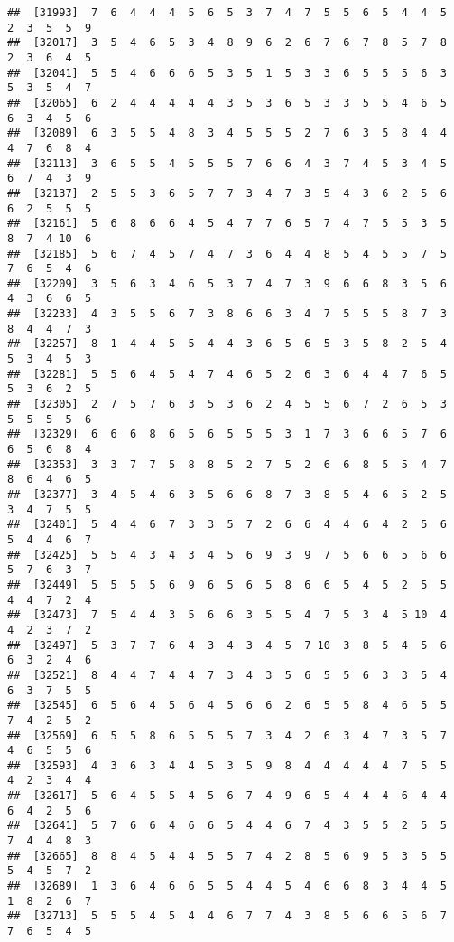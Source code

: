 \documentclass[
]{book}
\begin{document}
\begin{verbatim}
##  [31993]  7  6  4  4  4  5  6  5  3  7  4  7  5  5  6  5  4  4  5  2  3  5  5  9
##  [32017]  3  5  4  6  5  3  4  8  9  6  2  6  7  6  7  8  5  7  8  2  3  6  4  5
##  [32041]  5  5  4  6  6  6  5  3  5  1  5  3  3  6  5  5  5  6  3  5  3  5  4  7
##  [32065]  6  2  4  4  4  4  4  3  5  3  6  5  3  3  5  5  4  6  5  6  3  4  5  6
##  [32089]  6  3  5  5  4  8  3  4  5  5  5  2  7  6  3  5  8  4  4  4  7  6  8  4
##  [32113]  3  6  5  5  4  5  5  5  7  6  6  4  3  7  4  5  3  4  5  6  7  4  3  9
##  [32137]  2  5  5  3  6  5  7  7  3  4  7  3  5  4  3  6  2  5  6  6  2  5  5  5
##  [32161]  5  6  8  6  6  4  5  4  7  7  6  5  7  4  7  5  5  3  5  8  7  4 10  6
##  [32185]  5  6  7  4  5  7  4  7  3  6  4  4  8  5  4  5  5  7  5  7  6  5  4  6
##  [32209]  3  5  6  3  4  6  5  3  7  4  7  3  9  6  6  8  3  5  6  4  3  6  6  5
##  [32233]  4  3  5  5  6  7  3  8  6  6  3  4  7  5  5  5  8  7  3  8  4  4  7  3
##  [32257]  8  1  4  4  5  5  4  4  3  6  5  6  5  3  5  8  2  5  4  5  3  4  5  3
##  [32281]  5  5  6  4  5  4  7  4  6  5  2  6  3  6  4  4  7  6  5  5  3  6  2  5
##  [32305]  2  7  5  7  6  3  5  3  6  2  4  5  5  6  7  2  6  5  3  5  5  5  5  6
##  [32329]  6  6  6  8  6  5  6  5  5  5  3  1  7  3  6  6  5  7  6  6  5  6  8  4
##  [32353]  3  3  7  7  5  8  8  5  2  7  5  2  6  6  8  5  5  4  7  8  6  4  6  5
##  [32377]  3  4  5  4  6  3  5  6  6  8  7  3  8  5  4  6  5  2  5  3  4  7  5  5
##  [32401]  5  4  4  6  7  3  3  5  7  2  6  6  4  4  6  4  2  5  6  5  4  4  6  7
##  [32425]  5  5  4  3  4  3  4  5  6  9  3  9  7  5  6  6  5  6  6  5  7  6  3  7
##  [32449]  5  5  5  5  6  9  6  5  6  5  8  6  6  5  4  5  2  5  5  4  4  7  2  4
##  [32473]  7  5  4  4  3  5  6  6  3  5  5  4  7  5  3  4  5 10  4  4  2  3  7  2
##  [32497]  5  3  7  7  6  4  3  4  3  4  5  7 10  3  8  5  4  5  6  6  3  2  4  6
##  [32521]  8  4  4  7  4  4  7  3  4  3  5  6  5  5  6  3  3  5  4  6  3  7  5  5
##  [32545]  6  5  6  4  5  6  4  5  6  6  2  6  5  5  8  4  6  5  5  7  4  2  5  2
##  [32569]  6  5  5  8  6  5  5  5  7  3  4  2  6  3  4  7  3  5  7  4  6  5  5  6
##  [32593]  4  3  6  3  4  4  5  3  5  9  8  4  4  4  4  4  7  5  5  4  2  3  4  4
##  [32617]  5  6  4  5  5  4  5  6  7  4  9  6  5  4  4  4  6  4  4  6  4  2  5  6
##  [32641]  5  7  6  6  4  6  6  5  4  4  6  7  4  3  5  5  2  5  5  7  4  4  8  3
##  [32665]  8  8  4  5  4  4  5  5  7  4  2  8  5  6  9  5  3  5  5  5  4  5  7  2
##  [32689]  1  3  6  4  6  6  5  5  4  4  5  4  6  6  8  3  4  4  5  1  8  2  6  7
##  [32713]  5  5  5  4  5  4  4  6  7  7  4  3  8  5  6  6  5  6  7  7  6  5  4  5

\end{verbatim}
\end{document}
